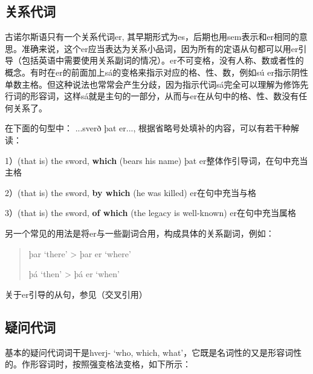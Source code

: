 \subsection{关系代词}\label{关系代词}

古诺尔斯语只有一个关系代词er,
其早期形式为es，后期也用sem表示和er相同的意思。准确来说，这个er应当表达为关系小品词，因为所有的定语从句都可以用er引导（包括英语中需要使用关系副词的情况）。er不可变格，没有人称、数或者性的概念。有时在er的前面加上sá的变格来指示对应的格、性、数，例如sú
er指示阴性单数主格。但这种说法也常常会产生分歧，因为指示代词sá完全可以理解为修饰先行词的形容词，这样sá就是主句的一部分，从而与er在从句中的格、性、数没有任何关系了。

在下面的句型中： ...sverð þat er...,
根据省略号处填补的内容，可以有若干种解读：

1）(that is) the sword, \textbf{which} (bears his name)‌ þat
er整体作引导词，在句中充当主格

2）(that is) the sword, \textbf{by which} (he was killed)‌
er在句中充当与格

3）(that is) the sword, \textbf{of which} (the legacy is well-known)‌
er在句中充当属格

另一个常见的用法是将er与一些副词合用，构成具体的关系副词，例如：

\begin{quote}
  þar `there‌' \textgreater{} þar er `where‌'

  þá `then‌' \textgreater{} þá er `when‌'
\end{quote}

关于er引导的从句，参见（交叉引用）

\subsection{疑问代词}\label{疑问代词}

基本的疑问代词词干是hverj- `who, which,
what‌'，它既是名词性的又是形容词性的。作形容词时，按照强变格法变格，如下所示：

